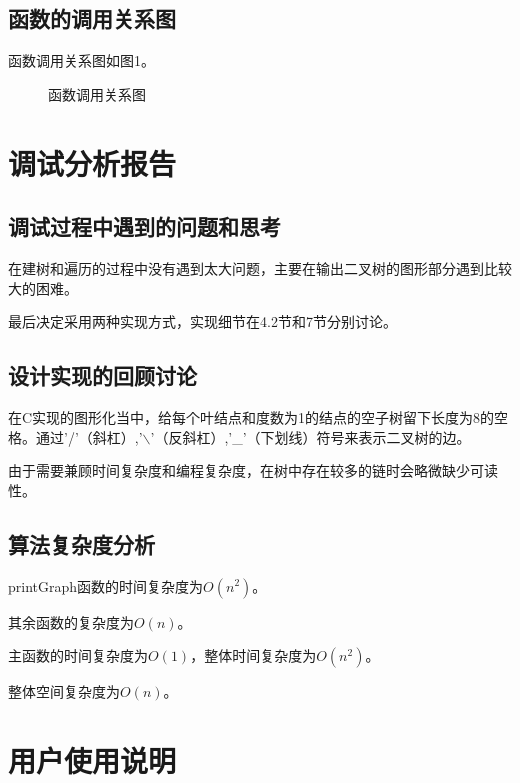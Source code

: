 \documentclass{article}
\begin{document}
\subsection{函数的调用关系图}

函数调用关系图如图1。

\begin{figure}[htbp]


    \caption{函数调用关系图}

\end{figure}

\section{调试分析报告}

\subsection{调试过程中遇到的问题和思考}

在建树和遍历的过程中没有遇到太大问题，主要在输出二叉树的图形部分遇到比较大的困难。

最后决定采用两种实现方式，实现细节在4.2节和7节分别讨论。

\subsection{设计实现的回顾讨论}

在C实现的图形化当中，给每个叶结点和度数为1的结点的空子树留下长度为8的空格。通过'/'（斜杠）,'$\backslash$'（反斜杠）,'\_'（下划线）符号来表示二叉树的边。

由于需要兼顾时间复杂度和编程复杂度，在树中存在较多的链时会略微缺少可读性。

\subsection{算法复杂度分析}

printGraph函数的时间复杂度为$O(n^2)$。

其余函数的复杂度为$O(n)$。

主函数的时间复杂度为$O(1)$，整体时间复杂度为$O(n^2)$。

整体空间复杂度为$O(n)$。

\section{用户使用说明}
\end{document}

